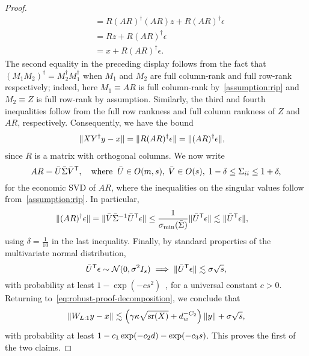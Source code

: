 \begin{proof}
\begin{align*}
        &=
        R (AR)^{\dag} (AR) z + R(AR)^{\dag} \epsilon \\
        &= Rz + R(AR)^{\dag} \epsilon \\
        &= x + R(AR)^{\dag} \epsilon.
    \end{align*}
    The second equality in the preceding display follows from the fact
    that $(M_1 M_2)^{\dag} = M_2^{\dag} M_1^{\dag}$ when $M_1$ and $M_2$ are full column-rank and full row-rank respectively; indeed, here $M_1 \equiv AR$ is
    full column-rank by~\cref{assumption:rip} and $M_2 \equiv Z$ is full
    row-rank by assumption. Similarly, the third and fourth inequalities
    follow from the full row rankness and full column rankness of $Z$ and $AR$, respectively. Consequently, we have the bound
    \begin{align*}
        \lVert XY^{\dag} y - x\rVert &=
        \lVert R(AR)^{\dag} \epsilon\rVert =
        \lVert(AR)^{\dag} \epsilon\rVert,
    \end{align*}
    since $R$ is a matrix with orthogonal columns. We now write
    \[
        AR = \bar{U} \bar{\Sigma} \bar{V}^{\mathsf{T}}, \quad \text{where} \;\;
        \bar{U} \in O(m, s), \;
        \bar{V} \in O(s), \;
        1 - \delta \leq \Sigma_{ii} \leq 1 + \delta,
    \]
    for the economic SVD of $AR$, where the inequalities on the singular
    values follow from~\cref{assumption:rip}. In particular,
    \begin{align*}
        \lVert(AR)^{\dag} \epsilon\rVert &=
        \lVert\bar{V} \bar{\Sigma}^{-1} \bar{U}^{\mathsf{T}} \epsilon\rVert
        \leq
        \frac{1}{\sigma_{\min}(\bar{\Sigma})}
        \lVert\bar{U}^{\mathsf{T}} \epsilon\rVert
        \lesssim
        \lVert\bar{U}^{\mathsf{T}} \epsilon\rVert,
    \end{align*}
    using $\delta = \frac{1}{10}$ in the last inequality.
    Finally, by standard properties of the multivariate normal distribution,
    \[
        \bar{U}^{\mathsf{T}} \epsilon \sim \mathcal{N}(0, \sigma^2 I_{s}) \implies
        \lVert\bar{U}^{\mathsf{T}} \epsilon\rVert \lesssim
        \sigma \sqrt{s},
    \]
    with probability at least $1 - \exp(-c s^2)$~\citep[Theorem 3.1.1]{Ver18},
    for a universal constant $c > 0$.
    Returning to~\eqref{eq:robust-proof-decomposition}, we conclude that
    \[
        \lVert W_{L:1}y - x\rVert \lesssim 
        \left( \gamma \kappa \sqrt{\operatorname{\mathrm{sr}}(X)} + d_{w}^{-C_2} \right) \lVert y\rVert
        + \sigma \sqrt{s},
    \]
    with probability at least $1 - c_1 \exp(-c_2 d) - \exp(-c_3 s)$. This proves the first of the two claims.


\end{proof}
